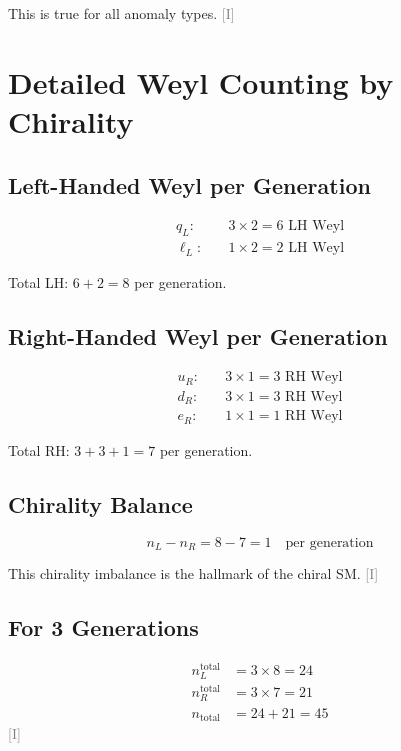 \documentclass[11pt,a4paper]{article}
\newcommand{\tagI}{\textcolor{gray}{[I]}}
\begin{document}
This is true for all anomaly types. \tagI

\section{Detailed Weyl Counting by Chirality}
\label{app:chirality-count}

\subsection{Left-Handed Weyl per Generation}

\begin{align}
\label{eq:LH-qL}
q_L: \quad & 3 \times 2 = 6 \text{ LH Weyl} \\
\label{eq:LH-lL}
\ell_L: \quad & 1 \times 2 = 2 \text{ LH Weyl}
\end{align}

Total LH: $6 + 2 = 8$ per generation.

\subsection{Right-Handed Weyl per Generation}

\begin{align}
\label{eq:RH-uR}
u_R: \quad & 3 \times 1 = 3 \text{ RH Weyl} \\
\label{eq:RH-dR}
d_R: \quad & 3 \times 1 = 3 \text{ RH Weyl} \\
\label{eq:RH-eR}
e_R: \quad & 1 \times 1 = 1 \text{ RH Weyl}
\end{align}

Total RH: $3 + 3 + 1 = 7$ per generation.

\subsection{Chirality Balance}

\begin{equation}
\label{eq:chiral-balance}
n_L - n_R = 8 - 7 = 1 \quad \text{per generation}
\end{equation}

This chirality imbalance is the hallmark of the chiral SM. \tagI

\subsection{For 3 Generations}

\begin{align}
\label{eq:3gen-LH}
n_L^{\text{total}} &= 3 \times 8 = 24 \\
\label{eq:3gen-RH}
n_R^{\text{total}} &= 3 \times 7 = 21 \\
\label{eq:3gen-total}
n_{\text{total}} &= 24 + 21 = 45
\end{align}
\tagI
\end{document}
